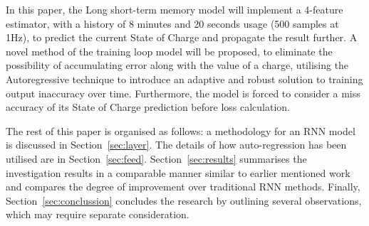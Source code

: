 %
In this paper, the Long short-term memory model will implement a 4-feature estimator, with a history of 8 minutes and 20 seconds usage (500 samples at 1Hz), to predict the current State of Charge and propagate the result further.
A novel method of the training loop model will be proposed, to eliminate the possibility of accumulating error along with the value of a charge, utilising the Autoregressive technique to introduce an adaptive and robust solution to training output inaccuracy over time.
Furthermore, the model is forced to consider a miss accuracy of its State of Charge prediction before loss calculation.

%
%
The rest of this paper is organised as follows: a methodology for an RNN model is discussed in Section~\ref{sec:layer}.
The details of how auto-regression has been utilised are in Section~\ref{sec:feed}.
Section~\ref{sec:results} summarises the investigation results in a comparable manner similar to earlier mentioned work and compares the degree of improvement over traditional RNN methods.
Finally, Section~\ref{sec:conclussion} concludes the research by outlining several observations, which may require separate consideration.
